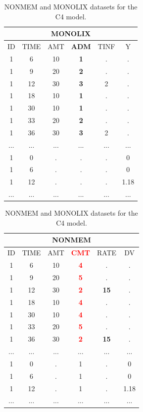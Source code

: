 \begin{table}[h!]
\footnotesize
\parbox{.5\linewidth}{
\centering
\begin{tabular}{cccccc}
  \hline
   \multicolumn{6}{c}{\textbf{MONOLIX}} \\
  \hline
ID	& TIME  & AMT	 & \textbf{ADM} &  TINF &	Y \\
  \hline
1	& 6	    & 10	& \textbf{1}	 & .	 & . \\
1	& 9	    & 20	& \textbf{2}	 & .	 & . \\
1	& 12	    & 30	& \textbf{3}	 & 2	 & . \\
1	& 18	    & 10	& \textbf{1}	 & .	 & . \\
1	& 30	    & 10	& \textbf{1}	 & .	 & . \\
1	& 33	    & 20	& \textbf{2}	 & .	 & . \\
1	& 36	    & 30	& \textbf{3}	 & 2	 & . \\
...     &  ...     &  ...     &  ...  & ...  & ... \\
1	& 0	    & .	& .	& .	& 0 \\
1	& 6	    & .	& .	& .	& 0 \\
1	& 12	    & .	& .	& .	& 1.18 \\
...     &  ...     &  ...     & ...  & ...  & ...\\
\end{tabular}
}
\hfill
\parbox{.5\linewidth}{
\centering
\begin{tabular}{cccccc}
  \hline
   \multicolumn{6}{c}{\textbf{NONMEM}} \\
  \hline
ID	& TIME  & AMT	 & \textbf{\textcolor{red}{CMT}} &  RATE &	DV \\
  \hline
1	& 6	    & 10	& \textbf{\textcolor{red}{4}}	 & .	 & . \\
1	& 9	    & 20	& \textbf{\textcolor{red}{5}}	 & .	 & . \\
1	& 12	    & 30	& \textbf{\textcolor{red}{2}}	 & \textbf{15}	 & . \\
1	& 18	    & 10	& \textbf{\textcolor{red}{4}}	 & .	 & . \\
1	& 30	    & 10	& \textbf{\textcolor{red}{4}}	 & .	 & . \\
1	& 33	    & 20	& \textbf{\textcolor{red}{5}}	 & .	 & . \\
1	& 36	    & 30	& \textbf{\textcolor{red}{2}}	 & \textbf{15}	 & . \\
...     &  ...     &  ...     &  ...  & ...  & ... \\
1	& 0	    & .	& 1	& .	& 0 \\
1	& 6	    & .	& 1	& .	& 0 \\
1	& 12	    & .	& 1	& .	& 1.18 \\
...     &  ...     &  ...     & ...  & ...  & ...\\
\end{tabular}
}
\caption{NONMEM and MONOLIX datasets for the C4 model.}
\end{table}

